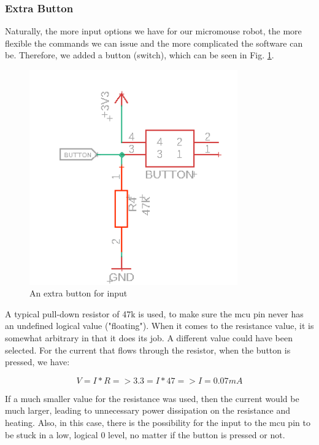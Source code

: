 \vspace{1cm}


\subsubsection{Extra Button}

Naturally, the more input options we have for our micromouse robot, the more flexible the commands we can issue and the more complicated the software can be. Therefore, we added a button (switch), which can be seen in Fig. \ref{fig:button}.

\begin{figure}[htb]
    \centering
    \includegraphics[width=0.8\textwidth]{figures/hardware/Button.PNG}
    \caption{An extra button for input}
    \label{fig:button}
\end{figure}

\FloatBarrier

A typical pull-down resistor of 47k is used, to make sure the mcu pin never has an undefined logical value ("floating"). When it comes to the resistance value, it is somewhat arbitrary in that it does its job. A different value could have been selected.
For the current that flows through the resistor, when the button is pressed, we have:

$$V = I*R => 3.3 = I*47 => I = 0.07mA$$

If a much smaller value for the resistance was used, then the current would be much larger, leading to unnecessary power dissipation on the resistance and heating. Also, in this case, there is the possibility for the input to the mcu pin to be stuck in a low, logical 0 level, no matter if the button is pressed or not.

